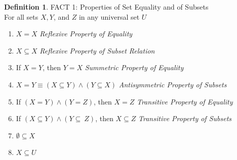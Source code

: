 \documentclass{book}
\theoremstyle{definition}
\newtheorem{definition}{Definition}[section]
\theoremstyle{remark}
\begin{document}
\begin{definition}
FACT 1: Properties of Set Equality and of Subsets \\

    For all sets $X, Y$, and $Z$ in any universal set $U$ \\
    
    \begin{enumerate}
        \item $X=X$ \textit{Reflexive Property of Equality}
        \item $X \subseteq X$ \textit{Reflexive Property of Subset Relation}
        \item If $X=Y$, then $Y=X$ \textit{Summetric Property of Equality} 
        \item $X=Y \equiv (X \subseteq Y) \wedge (Y \subseteq X)$ \textit{Antisymmetric Property of Subsets}
        \item If $(X=Y) \wedge (Y=Z)$, then $X=Z$ \textit{Transitive Property of Equality} 
        \item If $(X \subseteq Y) \wedge (Y \subseteq\ Z)$, then $X \subseteq Z$ \textit{Transitive Property of Subsets} 
        \item $\emptyset \subseteq X$
        \item $X \subseteq U$  
    \end{enumerate}
\end{definition}
\end{document}
